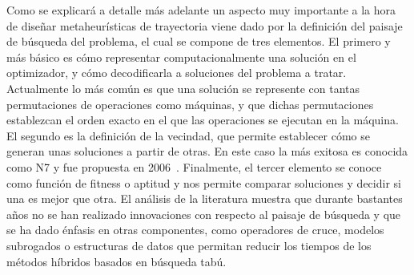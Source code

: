 Como se explicará a detalle más adelante un aspecto muy importante a la hora de diseñar metaheurísticas de trayectoria viene dado por la definición del
paisaje de búsqueda del problema, el cual se compone de tres elementos.
%
El primero y más básico es cómo representar computacionalmente una solución en el optimizador, y cómo decodificarla a soluciones del problema a tratar.
%
Actualmente lo más común es que una solución se represente con tantas permutaciones de operaciones como máquinas, y que dichas permutaciones establezcan
el orden exacto en el que las operaciones se ejecutan en la máquina.
%
El segundo es la definición de la vecindad, que permite establecer cómo se generan unas soluciones a partir de otras.
%
En este caso la más exitosa es conocida como N7 y fue propuesta en 2006~\cite{Zhang2007}. 
%
Finalmente, el tercer elemento se conoce como función de fitness o aptitud y nos permite comparar soluciones y decidir si una es mejor que otra. 
%
El análisis de la literatura muestra que durante bastantes años no se han realizado innovaciones con respecto al paisaje de búsqueda y que se ha dado
énfasis en otras componentes, como operadores de cruce, modelos subrogados o estructuras de datos que permitan reducir los tiempos de los métodos híbridos
basados en búsqueda tabú.


